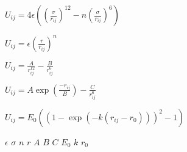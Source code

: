 \documentclass[a4paper,10pt]{article}
\begin{document}

$U_{ij} = 4 \epsilon \left(\left( \frac{\sigma}{r_{ij}}\right)^{12} - n\left(\frac{\sigma}{r_{ij}}\right)^{6} \right) $
\clearpage

$U_{ij} = \epsilon \left( \frac{r}{r_{ij}} \right)^n$
\clearpage

$U_{ij} = \frac{A}{r_{ij}^{12}} - \frac{B}{r_{ij}^6}$
\clearpage

$U_{ij} = A \exp\left(\frac{-r_{ij}}{B}\right) - \frac{C}{r_{ij}^6}$ \\
\clearpage

$U_{ij} = E_0  \left( \left(1 - \exp\left(-k\left(r_{ij} - r_0\right) \right) \right)^2 - 1 \right)$
\clearpage

$\epsilon$
\clearpage
$\sigma$
\clearpage
$n$
\clearpage
$r$
\clearpage
$A$
\clearpage
$B$
\clearpage
$C$
\clearpage
$E_0$
\clearpage
$k$
\clearpage
$r_0$



\end{document}
